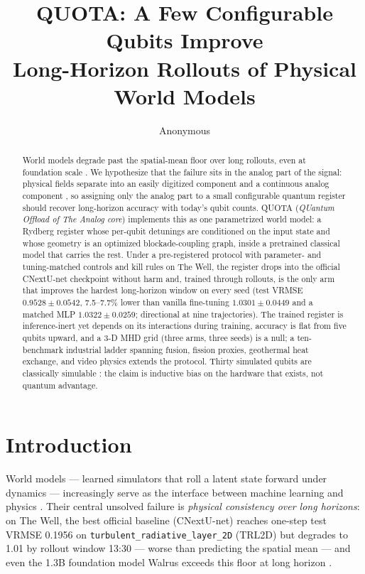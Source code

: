 \documentclass{article}
\title{QUOTA: A Few Configurable Qubits Improve\\
Long-Horizon Rollouts of Physical World Models}
\author{Anonymous}
\newcommand{\TRLanchorPub}{0.1956}    %
\newcommand{\TDvanilla}{$1.0301 \pm 0.0449$}
\newcommand{\TDquantum}{$\mathbf{0.9528 \pm 0.0542}$}
\newcommand{\TDmlp}{$1.0322 \pm 0.0259$}
\begin{document}
\maketitle

\begin{abstract}
World models degrade past the spatial-mean floor over long rollouts, even
at foundation scale \citep{ohana2024thewell,mccabe2025walrus}. We
hypothesize that the failure sits in the analog part of the signal:
physical fields separate into an easily digitized component and a
continuous analog component \citep{mallat1989multiresolution,daubechies1992ten},
so assigning only the analog part to a small configurable quantum register
should recover long-horizon accuracy with today's qubit counts. QUOTA
(\emph{QUantum Offload of The Analog core}) implements this as one
parametrized world model: a Rydberg register whose per-qubit detunings are
conditioned on the input state and whose geometry is an optimized
blockade-coupling graph, inside a pretrained classical model that carries
the rest. Under a pre-registered protocol with parameter- and tuning-matched
controls and kill rules on The Well, the register drops into the official
CNextU-net checkpoint without harm and, trained through rollouts, is the
only arm that improves the hardest long-horizon window on every seed (test VRMSE \TDquantum{}, 7.5--7.7\% lower than vanilla fine-tuning \TDvanilla{} and a matched MLP \TDmlp{}; directional at nine trajectories). The trained register is inference-inert
yet depends on its interactions during training, accuracy is flat from
five qubits upward, and a 3-D MHD grid (three arms, three seeds) is a null; a
ten-benchmark industrial ladder spanning fusion, fission proxies,
geothermal heat exchange, and video physics extends the protocol. Thirty
simulated qubits are classically simulable
\citep{schuld2022advantage,cerezo2025barren}: the claim is inductive bias
on the hardware that exists, not quantum advantage.
\end{abstract}

\section{Introduction}
\label{sec:intro}

World models --- learned simulators that roll a latent state forward under
dynamics --- increasingly serve as the interface between machine learning
and physics \citep{ohana2024thewell,mccabe2025walrus,gao2026lingbotworld}.
Their central unsolved failure is \emph{physical consistency over long
horizons}: on The Well, the best official baseline (CNextU-net) reaches
one-step test VRMSE \TRLanchorPub{} on
\texttt{turbulent\_radiative\_layer\_2D} (TRL2D) but degrades to 1.01 by
rollout window 13:30 --- worse than predicting the spatial mean --- and even
the 1.3B foundation model Walrus exceeds this floor at long horizon
\citep{ohana2024thewell,mccabe2025walrus}.
\end{document}

